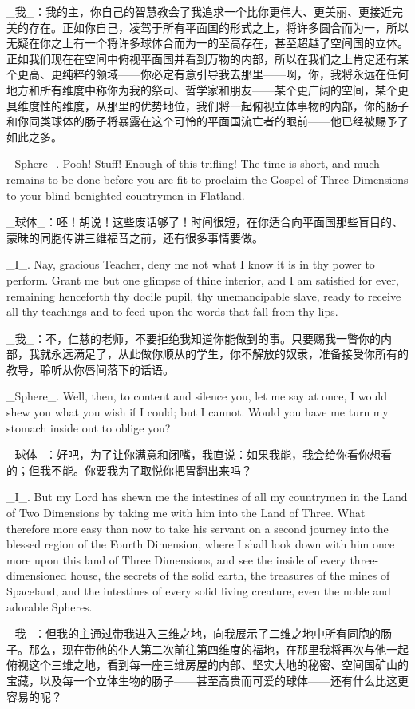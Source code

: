 \documentclass[12pt,UTF8]{ctexbook}
\begin{document}
\_我\_：我的主，你自己的智慧教会了我追求一个比你更伟大、更美丽、更接近完美的存在。正如你自己，凌驾于所有平面国的形式之上，将许多圆合而为一，所以无疑在你之上有一个将许多球体合而为一的至高存在，甚至超越了空间国的立体。正如我们现在在空间中俯视平面国并看到万物的内部，所以在我们之上肯定还有某个更高、更纯粹的领域——你必定有意引导我去那里——啊，你，我将永远在任何地方和所有维度中称你为我的祭司、哲学家和朋友——某个更广阔的空间，某个更具维度性的维度，从那里的优势地位，我们将一起俯视立体事物的内部，你的肠子和你同类球体的肠子将暴露在这个可怜的平面国流亡者的眼前——他已经被赐予了如此之多。

\_Sphere\_. Pooh! Stuff! Enough of this trifling! The time is short, and much remains to be done before you are fit to proclaim the Gospel of Three Dimensions to your blind benighted countrymen in Flatland.

\_球体\_：呸！胡说！这些废话够了！时间很短，在你适合向平面国那些盲目的、蒙昧的同胞传讲三维福音之前，还有很多事情要做。

\_I\_. Nay, gracious Teacher, deny me not what I know it is in thy power to perform. Grant me but one glimpse of thine interior, and I am satisfied for ever, remaining henceforth thy docile pupil, thy unemancipable slave, ready to receive all thy teachings and to feed upon the words that fall from thy lips.

\_我\_：不，仁慈的老师，不要拒绝我知道你能做到的事。只要赐我一瞥你的内部，我就永远满足了，从此做你顺从的学生，你不解放的奴隶，准备接受你所有的教导，聆听从你唇间落下的话语。

\_Sphere\_. Well, then, to content and silence you, let me say at once, I would shew you what you wish if I could; but I cannot. Would you have me turn my stomach inside out to oblige you?

\_球体\_：好吧，为了让你满意和闭嘴，我直说：如果我能，我会给你看你想看的；但我不能。你要我为了取悦你把胃翻出来吗？

\_I\_. But my Lord has shewn me the intestines of all my countrymen in the Land of Two Dimensions by taking me with him into the Land of Three. What therefore more easy than now to take his servant on a second journey into the blessed region of the Fourth Dimension, where I shall look down with him once more upon this land of Three Dimensions, and see the inside of every three-dimensioned house, the secrets of the solid earth, the treasures of the mines of Spaceland, and the intestines of every solid living creature, even the noble and adorable Spheres.

\_我\_：但我的主通过带我进入三维之地，向我展示了二维之地中所有同胞的肠子。那么，现在带他的仆人第二次前往第四维度的福地，在那里我将再次与他一起俯视这个三维之地，看到每一座三维房屋的内部、坚实大地的秘密、空间国矿山的宝藏，以及每一个立体生物的肠子——甚至高贵而可爱的球体——还有什么比这更容易的呢？
\end{document}
